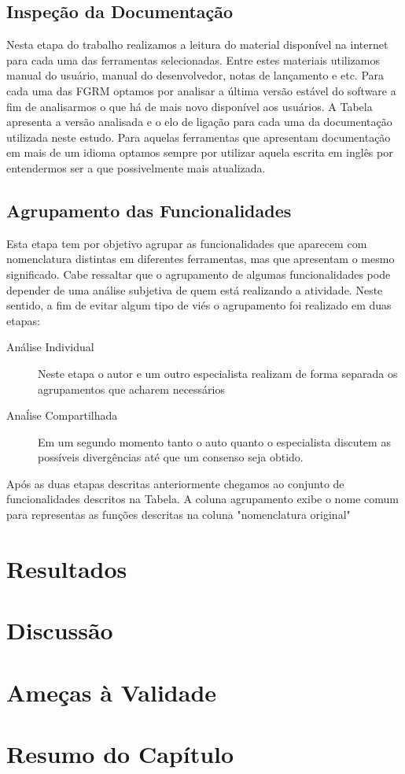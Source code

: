 \subsection{Inspeção da Documentação}
\label{ssub:Inspeção da Documentação}

Nesta etapa do trabalho realizamos a leitura do material disponível na internet
para cada uma das ferramentas selecionadas. Entre estes materiais utilizamos
manual do usuário, manual do desenvolvedor, notas de lançamento e etc. Para cada
uma das FGRM optamos por analisar a última versão estável do software a fim de
analisarmos o que há de mais novo disponível aos usuários. A Tabela apresenta a
versão analisada e o elo de ligação para cada uma da documentação utilizada
neste estudo. Para aquelas ferramentas que apresentam documentação em mais de um
idioma optamos sempre por utilizar aquela escrita em inglês por entendermos ser
a que possivelmente mais atualizada.

\subsection{Agrupamento das Funcionalidades}
\label{ssub:Agrupamento das Funcionalidades}

Esta etapa tem por objetivo agrupar as funcionalidades que aparecem com
nomenclatura distintas em diferentes ferramentas, mas que apresentam o mesmo
significado. Cabe ressaltar que o agrupamento de algumas funcionalidades pode
depender de uma análise subjetiva de quem está realizando a atividade.  Neste
sentido, a fim de evitar algum tipo de viés o agrupamento foi realizado em duas
etapas:

\begin{description}
	\item[Análise Individual] Neste etapa o autor e um outro especialista
		realizam de forma separada os agrupamentos que acharem necessários
	\item[Anaĺise Compartilhada] Em um segundo momento tanto o auto quanto o
		especialista discutem as possíveis divergências até que um consenso seja
		obtido.
\end{description}

Após as duas etapas descritas anteriormente chegamos ao conjunto de
funcionalidades descritos na Tabela. A coluna agrupamento exibe o nome comum
para representas as funções descritas na coluna "nomenclatura original"


\section{Resultados}
\label{sec:resultados}



\section{Discussão}
\label{sec:discussao}

\section{Ameças à Validade}
\label{sec:ameacas_a_validade}


\section{Resumo do Capítulo}
\label{sec:resumo_do_capitulo}